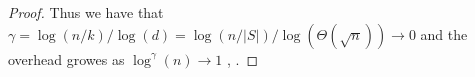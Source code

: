 \begin{proof}

  Thus we have that $\gamma = \log(n/k)/\log(d) =
  \log(n/|S|)/\log(\Theta(\sqrt{n})) \rightarrow 0$ and the overhead growes as
  $\log^{\gamma}(n) \rightarrow 1$ \cite{bravyi2012magic},
  \cite{meier2012magicstate}.
\end{proof}

\cite{leverrier2022quantum}
\cite{moore1998parallel}
\cite{bravyi2012magic}
\cite{Tillich_2014}
\cite{meier2012magicstate}



\fi


